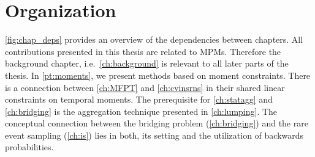 \section{Organization}
\autoref{fig:chap_deps} provides an overview of the dependencies between chapters.
All contributions presented in this thesis are related to \aclp{MPM}.
Therefore the background chapter, i.e.\ \autoref{ch:background} is relevant
to all later parts of the thesis.
In \autoref{pt:moments}, we present methods based on moment constraints.
There is a connection between \autoref{ch:MFPT} and \autoref{ch:cvinsrns} in their shared linear constraints on temporal moments.
The prerequisite for \autoref{ch:statagg} and \autoref{ch:bridging} is the aggregation
technique presented in \autoref{ch:lumping}.
The conceptual connection between the bridging problem (\autoref{ch:bridging}) and the rare event sampling (\autoref{ch:is}) lies in both, its setting and the utilization of backwards probabilities.
